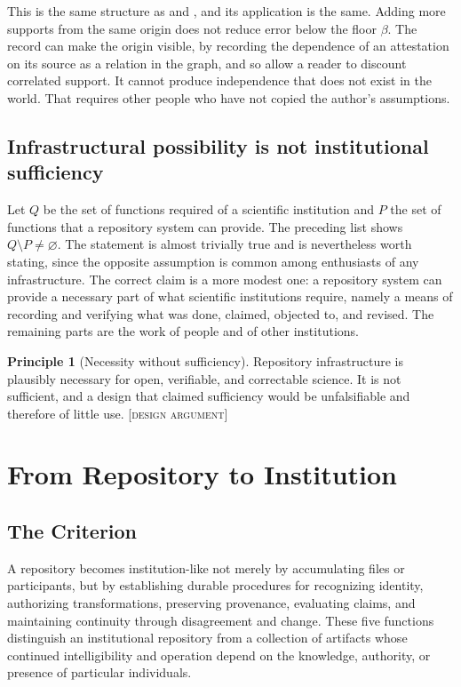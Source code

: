\documentclass[11pt,twoside,openright]{book}
\theoremstyle{plain}
\theoremstyle{definition}
\newtheorem{principle}[theorem]{Principle}
\theoremstyle{remark}
\newcommand{\Design}{\textup{\textsc{[design argument]}}}
\begin{document}
This is the same structure as  and , and its application is the same. Adding more supports from the same origin does not reduce error below the floor $\beta$. The record can make the origin visible, by recording the dependence of an attestation on its source as a relation in the graph, and so allow a reader to discount correlated support. It cannot produce independence that does not exist in the world. That requires other people who have not copied the author's assumptions.

\section{Infrastructural possibility is not institutional sufficiency}

Let $Q$ be the set of functions required of a scientific institution and $P$ the set of functions that a repository system can provide. The preceding list shows $Q\setminus P\neq\varnothing$. The statement is almost trivially true and is nevertheless worth stating, since the opposite assumption is common among enthusiasts of any infrastructure. The correct claim is a more modest one: a repository system can provide a necessary part of what scientific institutions require, namely a means of recording and verifying what was done, claimed, objected to, and revised. The remaining parts are the work of people and of other institutions.

\begin{principle}[Necessity without sufficiency]\label{pr:necessity}
Repository infrastructure is plausibly necessary for open, verifiable, and correctable science. It is not sufficient, and a design that claimed sufficiency would be unfalsifiable and therefore of little use.
\Design{}
\end{principle}

\chapter{From Repository to Institution}\label{ch:conclusion}

\section{The Criterion}

A repository becomes institution-like not merely by accumulating
files or participants, but by establishing durable procedures for
recognizing identity, authorizing transformations, preserving
provenance, evaluating claims, and maintaining continuity through
disagreement and change. These five functions distinguish an
institutional repository from a collection of artifacts whose
continued intelligibility and operation depend on the knowledge,
authority, or presence of particular individuals.
\end{document}
